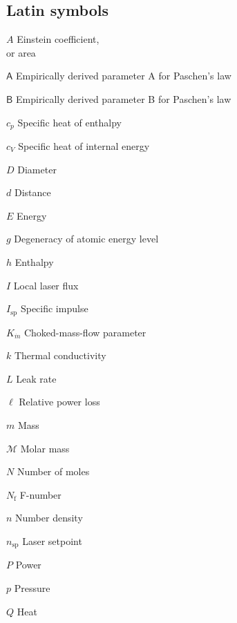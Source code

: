 \begin{multicols}{2}
    \section*{Latin symbols}
    \begin{nomlist}
        \item[$A$]              Einstein coefficient, \\or area%
        \item[$\mathsf{A}$]     Empirically derived parameter A for Paschen's law 
        \item[$\mathsf{B}$]     Empirically derived parameter B for Paschen's law 
        \item[$c_p$]            Specific heat of enthalpy
        \item[$c_V$]            Specific heat of internal energy
        \item[$D$]              Diameter
        \item[$d$]              Distance
        \item[$E$]              Energy
        \item[$g$]              Degeneracy of atomic energy level
        \item[$h$]              Enthalpy
        \item[$I$]              Local laser flux %
        \item[$I_\text{sp}$]    Specific impulse %
        \item[$K_{\dot{m}}$]    Choked-mass-flow parameter %
        \item[$k$]              Thermal conductivity 
        \item[$L$]              Leak rate
        \item[$\ell$]           Relative power loss
        \item[$m$]              Mass
        \item[$\mathcal{M}$]    Molar mass
        \item[$N$]              Number of moles 
        \item[$N_\mathrm{f}$]   F-number
        \item[$n$]              Number density 
        \item[$n_\mathrm{sp}$]  Laser setpoint 
        \item[$P$]              Power 
        \item[$p$]              Pressure
        \item[$Q$]              Heat

\end{nomlist}
\end{multicols}
